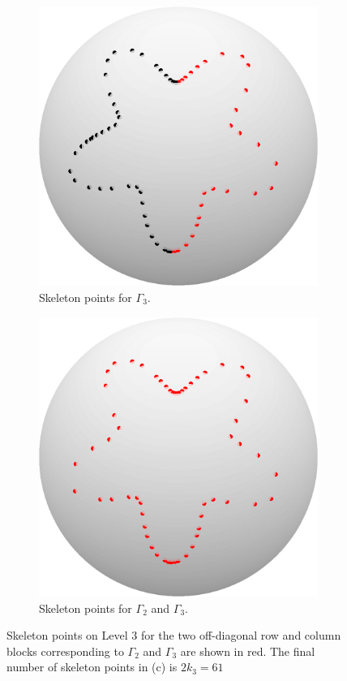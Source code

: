 \documentclass{sfuthesis}
\begin{document}
\begin{figure}[h]
\begin{subfigure}[b]{0.24\textwidth}
      		\includegraphics[width=\textwidth]{BFRecLev3Skel3}
    		\caption{Skeleton points for $\Gamma_{3}$.} 
       \end{subfigure}
       \quad
      \begin{subfigure}[b]{0.24\textwidth}
      \captionsetup{justification=centering}
     	 	\includegraphics[width=\textwidth]{BFRecLev3SkelAll}
    		\caption{Skeleton points for $\Gamma_2$ and $\Gamma_{3}$.} 
    		\label{fig: BFRecLev3SkelAll}
    \end{subfigure}
    \caption{Skeleton points on Level 3 for the two off-diagonal row and column blocks corresponding to $\Gamma_2$ and $\Gamma_{3}$ are shown in red. The final number of skeleton points in (c) is $2k_3=61$}
    \label{fig: BFRecLev3Skeleton}
\end{figure}
\end{document}
